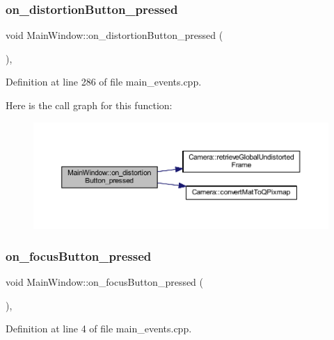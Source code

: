 \subsubsection{\texorpdfstring{on\_distortionButton\_pressed}{on\_distortionButton\_pressed}}
{\footnotesize\ttfamily void Main\+Window\+::on\+\_\+distortion\+Button\+\_\+pressed (\begin{DoxyParamCaption}{ }\end{DoxyParamCaption})\hspace{0.3cm}{\ttfamily [private]}, {\ttfamily [slot]}}



Definition at line 286 of file main\+\_\+events.\+cpp.

Here is the call graph for this function\+:
\nopagebreak
\begin{figure}[H]
\begin{center}
\leavevmode
\includegraphics[width=350pt]{classMainWindow_ab98ee5c1e01d4db75d27e3f00c7c4b78_cgraph}
\end{center}
\end{figure}
\mbox{\label{classMainWindow_a5e9d6c6b9249ee3478427d2e33dfb901}} 
\subsubsection{\texorpdfstring{on\_focusButton\_pressed}{on\_focusButton\_pressed}}
{\footnotesize\ttfamily void Main\+Window\+::on\+\_\+focus\+Button\+\_\+pressed (\begin{DoxyParamCaption}{ }\end{DoxyParamCaption})\hspace{0.3cm}{\ttfamily [private]}, {\ttfamily [slot]}}



Definition at line 4 of file main\+\_\+events.\+cpp.

